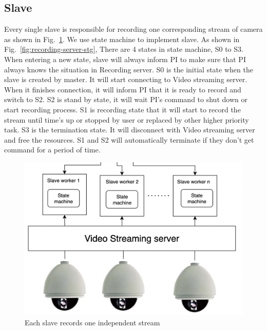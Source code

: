 \subsection{Slave}
Every single slave is responsible for recording one corresponding stream of camera as shown in Fig.~\ref{fig:recording-server-slave}. We use state machine to implement slave. As shown in Fig.~\ref{fig:recording-server-stg}, There are 4 states in state machine, S0 to S3. When entering a new state, slave will always inform PI to make sure that PI always knows the situation in Recording server. S0 is the initial state when the slave is created by master. It will start connecting to Video streaming server. When it finishes connection, it will inform PI that it is ready to record and switch to S2. S2 is stand by state, it will wait PI's command to shut down or start recording process. S1 is recording state that it will start to record the stream until time's up or stopped by user or replaced by other higher priority task. S3 is the termination state. It will disconnect with Video streaming server and free the resources. S1 and S2 will automatically terminate if they don't get command for a period of time.

\begin{figure}[H]
    \centering
    \includegraphics[width=\textwidth]{figsrc/recording-server-slave.png}
    \caption{Each slave records one independent stream\label{fig:recording-server-slave}}
\end{figure}


